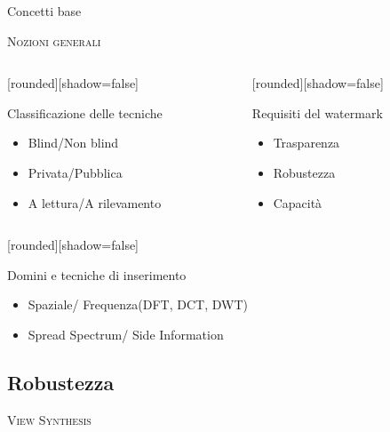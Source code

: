 \documentclass{beamer}
\begin{document}
\begin{section}{Concetti base}
\begin{frame}[t]{\textsc{Nozioni generali}}
\begin{columns}
\begin{column}{5cm}
\vspace{1em}
	[rounded][shadow=false]
\begin{block}{Classificazione delle tecniche}
\begin{itemize}
\item Blind/Non blind
\item Privata/Pubblica
\item A lettura/A rilevamento
\end{itemize}
\end{block}
\end{column}
\begin{column}{5cm}
\vspace{1em}
	[rounded][shadow=false]
\begin{block}{Requisiti del watermark}
\begin{itemize}
\item Trasparenza
\item Robustezza
\item Capacit\`{a}
\end{itemize}
\end{block}
\end{column}
\end{columns}
\vspace{1em}
[rounded][shadow=false]
\begin{block}{Domini e tecniche di inserimento}
\begin{itemize}
\item Spaziale/ Frequenza(DFT, DCT, DWT)
\item Spread Spectrum/ Side Information
\end{itemize}
\end{block}
\end{frame}

\subsection{Robustezza}
\vspace{2em}
\begin{frame}[t]{\textsc{View Synthesis}}


\end{frame}
\end{section}
\end{document}
